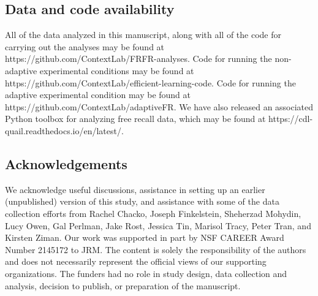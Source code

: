 \documentclass[11pt]{article}
\begin{document}
\subsection*{Data and code availability}

All of the data analyzed in this manuscript, along with all of the code for
carrying out the analyses may be found at
https://github.com/ContextLab/FRFR-analyses. Code for running the non-adaptive
experimental conditions may be found at
https://github.com/Con\-text\-Lab/efficient-learning-code. Code for running the
adaptive experimental condition may be found at
https://github.com/ContextLab/adaptiveFR. We have also released an associated
Python toolbox for analyzing free recall data, which may be found at
https://cdl-quail.read\-the\-docs.io/\-en/\-latest/.

\subsection*{Acknowledgements}

We acknowledge useful discussions, assistance in setting up an earlier
(unpublished) version of this study, and assistance with some of the data
collection efforts from Rachel Chacko, Joseph Finkelstein, Sheherzad Mohydin,
Lucy Owen, Gal Perlman, Jake Rost, Jessica Tin, Marisol Tracy,
Peter Tran, and Kirsten Ziman. Our work was supported in part by NSF CAREER Award Number
2145172 to JRM. The content is solely the responsibility of the authors and
does not necessarily represent the official views of our supporting
organizations. The funders had no role in study design, data collection and
analysis, decision to publish, or preparation of the manuscript.



\end{document}
